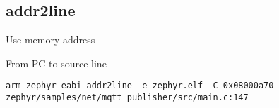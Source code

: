 \subsection{addr2line}

\begin{frame}[fragile]{Use memory address}
  \begin{exampleblock}{From PC to source line}
    \begin{lstlisting}[showstringspaces=false, basicstyle=\tiny]
arm-zephyr-eabi-addr2line -e zephyr.elf -C 0x08000a70
zephyr/samples/net/mqtt_publisher/src/main.c:147
    \end{lstlisting}
  \end{exampleblock}
\end{frame}

